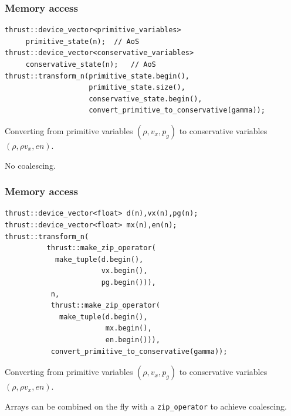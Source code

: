 \documentclass{beamer}
\begin{document}
\begin{frame}[fragile]
\frametitle{Memory access}
\begin{lstlisting}
thrust::device_vector<primitive_variables>    
     primitive_state(n);  // AoS
thrust::device_vector<conservative_variables> 
     conservative_state(n);   // AoS
thrust::transform_n(primitive_state.begin(),
                    primitive_state.size(),
                    conservative_state.begin(),
                    convert_primitive_to_conservative(gamma));
\end{lstlisting} 
\bei
\item Converting from primitive variables $(\rho,v_x, p_g)$ to conservative variables $(\rho,\rho v_x, en)$.
\item No coalescing.
\ebi
\end{frame}

\begin{frame}[fragile]
\frametitle{Memory access}
\begin{lstlisting}
thrust::device_vector<float> d(n),vx(n),pg(n); 
thrust::device_vector<float> mx(n),en(n); 
thrust::transform_n(
          thrust::make_zip_operator(
            make_tuple(d.begin(),
                       vx.begin(),
                       pg.begin())),
           n,
           thrust::make_zip_operator(
             make_tuple(d.begin(),
                        mx.begin(),
                        en.begin())),
           convert_primitive_to_conservative(gamma));
\end{lstlisting} 
\bei
\item Converting from primitive variables $(\rho,v_x, p_g)$ to conservative variables $(\rho,\rho v_x, en)$.
\item Arrays can be combined on the fly with a \verb+zip_operator+ to achieve coalescing.
\ebi
\end{frame}
\end{document}
